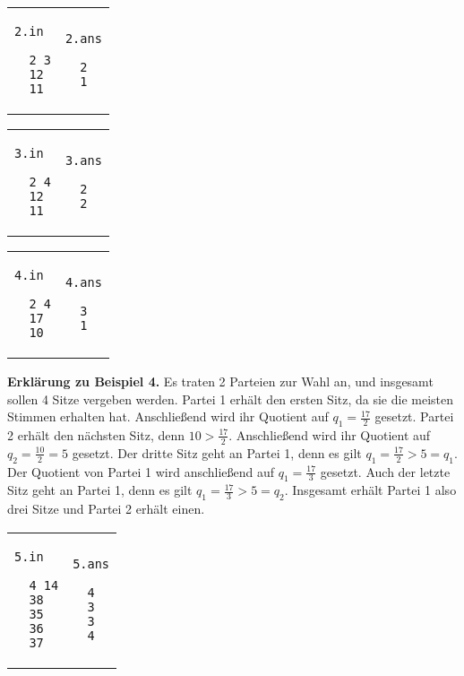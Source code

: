 \documentclass{uebung_cs}
\begin{document}
\begin{aufgabe}
  \begin{tabular}{p{}p{}}
  \texttt{2.in}
  \begin{verbatim}
  2 3
  12
  11
  \end{verbatim}
  &
  \texttt{2.ans}
  \begin{verbatim}
  2
  1
  \end{verbatim}
  \end{tabular}
  
  \begin{tabular}{p{}p{}}
  \texttt{3.in}
  \begin{verbatim}
  2 4
  12
  11
  \end{verbatim}
  &
  \texttt{3.ans}
  \begin{verbatim}
  2
  2
  \end{verbatim}
  \end{tabular}
  
  \begin{tabular}{p{}p{}}
  \texttt{4.in}
  \begin{verbatim}
  2 4
  17
  10
  \end{verbatim}
  &
  \texttt{4.ans}
  \begin{verbatim}
  3
  1
  \end{verbatim}
  \end{tabular}
  
  \textbf{Erklärung zu Beispiel 4.}
  Es traten 2 Parteien zur Wahl an, und insgesamt sollen 4 Sitze vergeben werden.
  Partei 1 erhält den ersten Sitz, da sie die meisten Stimmen erhalten hat. 
  Anschließend wird ihr Quotient auf $q_1 = \frac{17}{2}$ gesetzt.
  Partei 2 erhält den nächsten Sitz, denn $10 > \frac{17}{2}$.
  Anschließend wird ihr Quotient auf $q_2 = \frac{10}{2} = 5$ gesetzt.
  Der dritte Sitz geht an Partei 1, denn es gilt $q_1 = \frac{17}{2} > 5 = q_1$.
  Der Quotient von Partei 1 wird anschließend auf $q_1 = \frac{17}{3}$ gesetzt.
  Auch der letzte Sitz geht an Partei 1, denn es gilt $q_1 = \frac{17}{3} > 5 = q_2$.
  Insgesamt erhält Partei 1 also drei Sitze und Partei 2 erhält einen.
  
  \begin{tabular}{p{}p{}}
  \texttt{5.in}
  \begin{verbatim}
  4 14
  38
  35
  36
  37
  \end{verbatim}
  &
  \texttt{5.ans}
  \begin{verbatim}
  4
  3
  3
  4
  \end{verbatim}
  \end{tabular}
  

\end{aufgabe}
\end{document}

